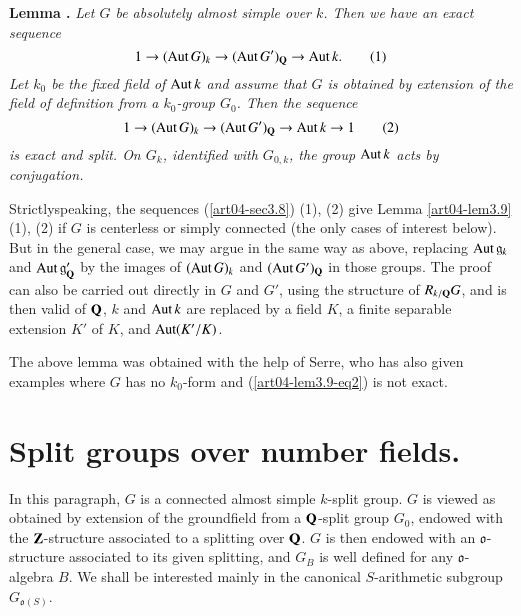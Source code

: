 \medskip
\noindent
{\bf Lemma .\label{art04-lem3.9}}
{\em Let $G$ be absolutely almost simple over $k$. Then we have an exact sequence}
\begin{equation*}
1\to (\operatorname{\mathrm{Aut}} G)_{k}\to (\operatorname{\mathrm{Aut}} G')_{\mathbf{Q}}\to \operatorname{\mathrm{Aut}} k.\tag{1}\label{art04-lem3.9-eq1}
\end{equation*}
{\em Let $k_{0}$ be the fixed field of $\operatorname{\mathrm{Aut}} k$ and assume that $G$ is obtained by extension of the field of definition from a $k_{0}$-group $G_{0}$. Then the sequence}
\begin{equation*}
1\to (\operatorname{\mathrm{Aut}} G)_{k}\to (\operatorname{\mathrm{Aut}} G')_{\mathbf{Q}}\to \operatorname{\mathrm{Aut}} k\to 1\tag{2}\label{art04-lem3.9-eq2}
\end{equation*}
{\em is exact and split. On $G_{k}$, identified with $G_{0,k}$, the group $\operatorname{\mathrm{Aut}} k$ acts by conjugation.}
\smallskip

Strictly\pageoriginale speaking, the sequences (\ref{art04-sec3.8}) (1), (2) give Lemma \ref{art04-lem3.9} (1), (2) if $G$ is centerless or simply connected (the only cases of interest below). But in the general case, we may argue in the same way as above, replacing $\operatorname{\mathrm{Aut}} \mathfrak{g}_{k}$ and $\operatorname{\mathrm{Aut}} \mathfrak{g}'_{\mathbf{Q}}$ by the images of $(\operatorname{\mathrm{Aut}} G)_{k}$ and $(\operatorname{\mathrm{Aut}} G')_{\mathbf{Q}}$ in those groups. The proof can also be carried out directly in $G$ and $G'$, using the structure of $R_{k/\mathbf{Q}}G$, and is then valid of $\mathbf{Q}$, $k$ and $\operatorname{\mathrm{Aut}} k$ are replaced by a field $K$, a finite separable extension $K'$ of $K$, and $\operatorname{\mathrm{Aut}} (K'/K)$.

\begin{remark*}
The above lemma was obtained with the help of Serre, who has also given examples where $G$ has no $k_{0}$-form and (\ref{art04-lem3.9-eq2}) is not exact.
\end{remark*}

\section{Split groups over number fields.}\label{art04-sec4}

In this paragraph, $G$ is a connected almost simple $k$-split group. $G$ is viewed as obtained by extension of the groundfield from a $\mathbf{Q}$-split group $G_{0}$, endowed with the $\mathbf{Z}$-structure associated to a splitting over $\mathbf{Q}$. $G$ is then endowed with an $\mathfrak{o}$-structure associated to its given splitting, and $G_{B}$ is well defined for any $\mathfrak{o}$-algebra $B$. We shall be interested mainly in the canonical $S$-arithmetic subgroup $G_{\mathfrak{o}(S)}$.


